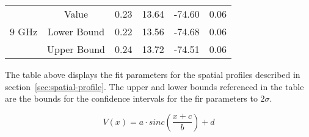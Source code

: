 {\begin{center}
\begin{tabular}{||c | c || c c c c||}
			\hline
			\multirow{3}{4em}{9 GHz} & Value & 0.23 & 13.64 & -74.60 & 0.06 \\ 
			& Lower Bound & 0.22 & 13.56 & -74.68 & 0.06 \\ 
			& Upper Bound & 0.24 & 13.72 & -74.51 & 0.06 \\ 
			\hline
		\end{tabular}
		\newline\newline
		\caption[Appendix A: Spatial Profile Fit Parameters]{The table above displays the fit parameters for the spatial profiles described in section~\ref{sec:spatial-profile}. The upper and lower bounds referenced in the table are the bounds for the confidence intervals for the fir parameters to $2\sigma$.}
	\end{center}
\par}
\begin{equation}
\label{eq:vxrestate}
V(x) = a\cdot sinc\left(\frac{x+c}{b}\right) + d
\end{equation}
\clearpage
\newpage
